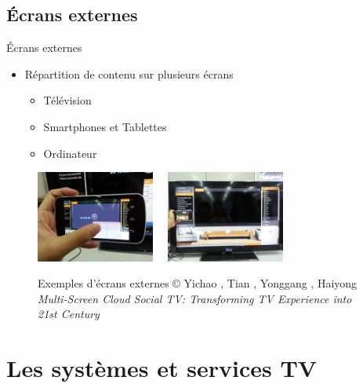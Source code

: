 \documentclass{beamer}
\begin{document}
	\subsection{Écrans externes}
	\begin{frame}{Écrans externes}
\begin{itemize}
	\item Répartition de contenu sur plusieurs écrans
		\begin{itemize}
			\item Télévision
			\item Smartphones et Tablettes
			\item Ordinateur
		\end{itemize}
\end{itemize}
\begin{figure}[H]
	\centering
	\includegraphics[height=3cm]{images/externalsScreens/1.png}~~
	\includegraphics[height=3cm]{images/externalsScreens/2.png}

	\caption{Exemples d'écrans externes\newline
	\tiny
	© Yichao , Tian , Yonggang , Haiyong \newline
	\textit{ Multi-Screen Cloud Social TV: Transforming TV Experience into 21st Century }
	}
\end{figure}
	\end{frame}
	\section{Les systèmes et services TV}
\end{document}
